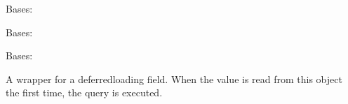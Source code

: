 \documentclass[letterpaper,10pt,spanish]{sphinxmanual}
\begin{document}
\begin{fulllineitems}
\begin{fulllineitems}
\end{fulllineitems}



\begin{fulllineitems}

\pysigstartsignatures
{}
\pysigstopsignatures
\end{fulllineitems}


\end{fulllineitems}



\begin{fulllineitems}

\pysigstartsignatures
{}
\pysigstopsignatures
\sphinxAtStartPar
Bases: 


\begin{fulllineitems}

\pysigstartsignatures
{}
\pysigstopsignatures
\sphinxAtStartPar
Bases: 

\end{fulllineitems}



\begin{fulllineitems}

\pysigstartsignatures
{}
\pysigstopsignatures
\sphinxAtStartPar
Bases: 

\end{fulllineitems}



\begin{fulllineitems}

\pysigstartsignatures
{}
\pysigstopsignatures
\sphinxAtStartPar
A wrapper for a deferred\sphinxhyphen{}loading field. When the value is read from this
object the first time, the query is executed.


\end{fulllineitems}
\end{fulllineitems}
\end{document}
